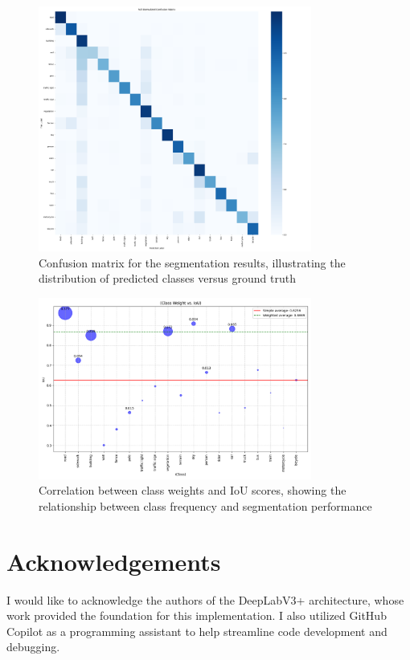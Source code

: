 \documentclass[]{article}
\begin{document}
\begin{figure}[htbp]
    \centering
    \includegraphics[width=0.8\textwidth]{outputs/deeplabv3plus_test_results/full_confusion_matrix.png}
    \caption{Confusion matrix for the segmentation results, illustrating the distribution of predicted classes versus ground truth}
    \label{fig:confusion_matrix}
\end{figure}

\begin{figure}[htbp]
    \centering
    \includegraphics[width=0.8\textwidth]{outputs/deeplabv3plus_test_results/class_weight_vs_iou.png}
    \caption{Correlation between class weights and IoU scores, showing the relationship between class frequency and segmentation performance}
    \label{fig:class_weight_vs_iou}
\end{figure}

\section{Acknowledgements}
I would like to acknowledge the authors of the DeepLabV3+ architecture, whose work provided the foundation for this implementation. I also utilized GitHub Copilot as a programming assistant to help streamline code development and debugging. 
\end{document}
